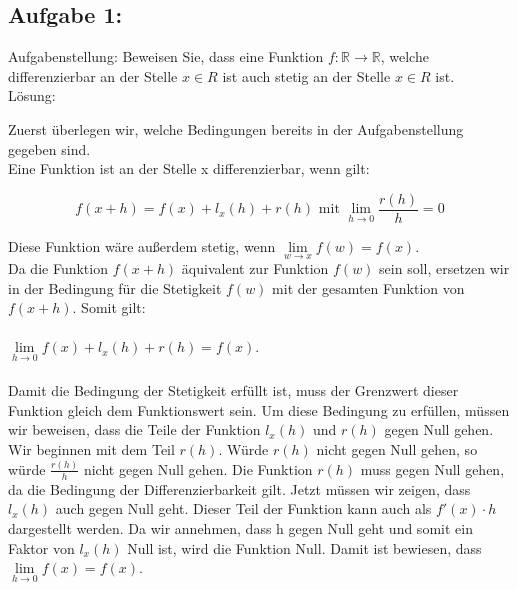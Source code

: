\subsection{Aufgabe 1:} 
Aufgabenstellung:
Beweisen Sie, dass eine Funktion $f:\mathds{R} \rightarrow \mathds{R}$, welche differenzierbar an der Stelle $x \in R$ ist auch stetig an der Stelle $x \in R$ ist.\\ %

Lösung:

Zuerst überlegen wir, welche Bedingungen bereits in der Aufgabenstellung gegeben sind. \\
Eine Funktion ist an der Stelle x differenzierbar, wenn gilt:

\begin{equation}f(x+h)=f(x)+l_x(h)+ r(h) \text{ mit } \lim\limits_{h \rightarrow 0} \frac{r(h)}{h}= 0 \end{equation} 

Diese Funktion wäre außerdem stetig, wenn $\lim\limits_{w \rightarrow x} f(w)=f(x)$.\\
Da die Funktion $f(x+h)$ äquivalent zur Funktion $f(w)$ sein soll, ersetzen wir in der Bedingung für die Stetigkeit $f(w)$ mit der gesamten Funktion von $f(x+h)$.  
Somit gilt: \\ \\
$\lim\limits_{h \rightarrow 0} f(x)+l_x(h)+r(h)=f(x)$. \\ \\

Damit die Bedingung der Stetigkeit erfüllt ist, muss der Grenzwert dieser Funktion gleich dem Funktionswert sein. Um diese Bedingung zu erfüllen, müssen wir beweisen, dass die Teile der Funktion $l_x(h)$ und $r(h)$ gegen Null gehen. Wir beginnen mit dem Teil $r(h)$.  Würde $r(h)$ nicht gegen Null gehen, so würde $\frac{r(h)}{h}$ nicht gegen Null gehen. Die Funktion $r(h)$ muss gegen Null gehen, da die Bedingung der Differenzierbarkeit gilt. Jetzt müssen wir zeigen, dass $l_x(h)$ auch gegen Null geht. Dieser Teil der Funktion kann auch als $f'(x) \cdot h$ dargestellt werden. Da wir annehmen, dass h gegen Null geht und somit ein Faktor von $l_x(h)$ Null ist, wird die Funktion Null. Damit ist bewiesen, dass $\lim\limits_{h \rightarrow 0} f(x)=f(x)$. \\

\vspace{15pt}

